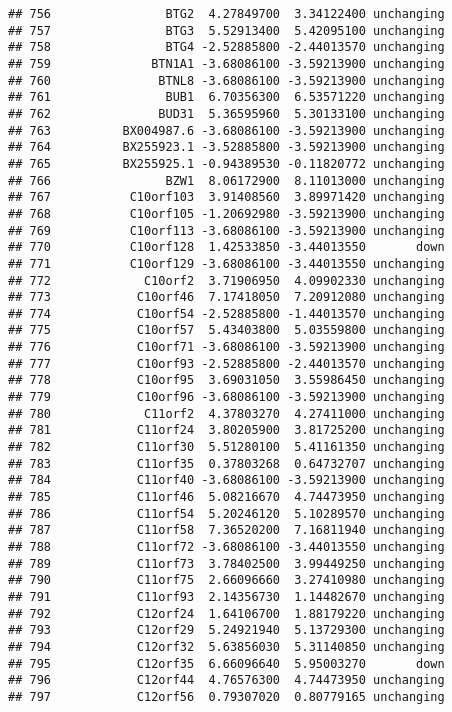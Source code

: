 \documentclass[]{article}
\begin{document}
\begin{verbatim}
## 756                BTG2  4.27849700  3.34122400 unchanging
## 757                BTG3  5.52913400  5.42095100 unchanging
## 758                BTG4 -2.52885800 -2.44013570 unchanging
## 759              BTN1A1 -3.68086100 -3.59213900 unchanging
## 760               BTNL8 -3.68086100 -3.59213900 unchanging
## 761                BUB1  6.70356300  6.53571220 unchanging
## 762               BUD31  5.36595960  5.30133100 unchanging
## 763          BX004987.6 -3.68086100 -3.59213900 unchanging
## 764          BX255923.1 -3.52885800 -3.59213900 unchanging
## 765          BX255925.1 -0.94389530 -0.11820772 unchanging
## 766                BZW1  8.06172900  8.11013000 unchanging
## 767           C10orf103  3.91408560  3.89971420 unchanging
## 768           C10orf105 -1.20692980 -3.59213900 unchanging
## 769           C10orf113 -3.68086100 -3.59213900 unchanging
## 770           C10orf128  1.42533850 -3.44013550       down
## 771           C10orf129 -3.68086100 -3.44013550 unchanging
## 772             C10orf2  3.71906950  4.09902330 unchanging
## 773            C10orf46  7.17418050  7.20912080 unchanging
## 774            C10orf54 -2.52885800 -1.44013570 unchanging
## 775            C10orf57  5.43403800  5.03559800 unchanging
## 776            C10orf71 -3.68086100 -3.59213900 unchanging
## 777            C10orf93 -2.52885800 -2.44013570 unchanging
## 778            C10orf95  3.69031050  3.55986450 unchanging
## 779            C10orf96 -3.68086100 -3.59213900 unchanging
## 780             C11orf2  4.37803270  4.27411000 unchanging
## 781            C11orf24  3.80205900  3.81725200 unchanging
## 782            C11orf30  5.51280100  5.41161350 unchanging
## 783            C11orf35  0.37803268  0.64732707 unchanging
## 784            C11orf40 -3.68086100 -3.59213900 unchanging
## 785            C11orf46  5.08216670  4.74473950 unchanging
## 786            C11orf54  5.20246120  5.10289570 unchanging
## 787            C11orf58  7.36520200  7.16811940 unchanging
## 788            C11orf72 -3.68086100 -3.44013550 unchanging
## 789            C11orf73  3.78402500  3.99449250 unchanging
## 790            C11orf75  2.66096660  3.27410980 unchanging
## 791            C11orf93  2.14356730  1.14482670 unchanging
## 792            C12orf24  1.64106700  1.88179220 unchanging
## 793            C12orf29  5.24921940  5.13729300 unchanging
## 794            C12orf32  5.63856030  5.31140850 unchanging
## 795            C12orf35  6.66096640  5.95003270       down
## 796            C12orf44  4.76576300  4.74473950 unchanging
## 797            C12orf56  0.79307020  0.80779165 unchanging

\end{verbatim}
\end{document}
